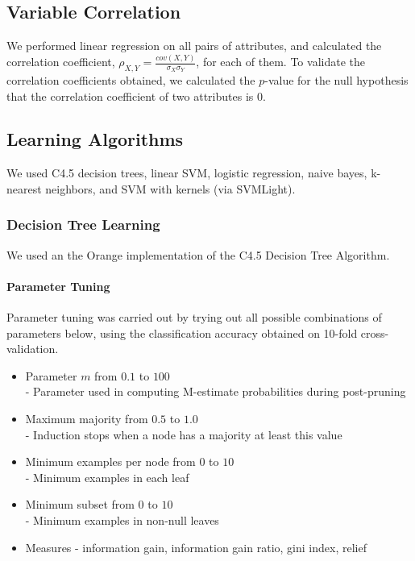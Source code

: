 \documentclass[11pt,letter]{article}
\begin{document}
\subsection{Variable Correlation}
We performed linear regression on all pairs of attributes, and calculated the correlation coefficient, $\rho_{X,Y} = \frac{cov(X,Y)}{\sigma_X\sigma_Y}$, for each of them. To validate the correlation coefficients obtained, we calculated the $p$-value for the null hypothesis that the correlation coefficient of two attributes is 0.

\subsection{Learning Algorithms}
We used C4.5 decision trees, linear SVM, logistic regression, naive bayes, k-nearest neighbors, and SVM with kernels (via SVMLight).

\subsubsection{Decision Tree Learning}

We used an the Orange implementation of the C4.5 Decision Tree Algorithm.

\paragraph{Parameter Tuning}
Parameter tuning was carried out by trying out all possible combinations of parameters below, using the classification accuracy obtained on 10-fold cross-validation.

\begin{itemize}
	\item Parameter $m$ from $0.1$ to $100$ \\
		- Parameter used in computing M-estimate probabilities during post-pruning
	\item Maximum majority from $0.5$ to $1.0$ \\
		- Induction stops when a node has a majority at least this value
	\item Minimum examples per node from $0$ to $10$ \\
		- Minimum examples in each leaf
	\item Minimum subset from $0$ to $10$ \\
		- Minimum examples in non-null leaves
	\item Measures - information gain, information gain ratio, gini index, relief %
\end{itemize}
\end{document}
